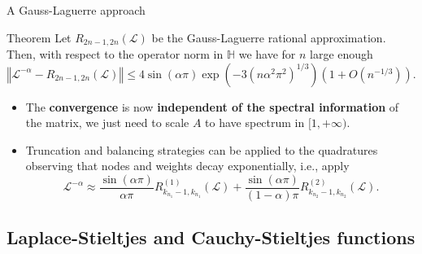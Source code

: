 \documentclass[aspectratio=169,xcolor=dvipsnames]{beamer}
\begin{document}
	\begin{frame}{A Gauss-Laguerre approach~\parencite{MR4410753}}	
	
	\begin{alertblock}{Theorem \parencite[Proposition 5.3]{MR4410753}}
	Let $R_{2n-1,2n}(\mathcal{L})$ be the Gauss-Laguerre rational approximation. Then, with respect to the operator norm in $\mathbb{H}$ we have for $n$ large enough 
	\begin{equation*}
		\left\Vert \mathcal{L}^{-\alpha }-R_{2n-1,2n}(\mathcal{L})\right\Vert  \leq 4\sin
		(\alpha \pi )\exp \left( -3\left( n\alpha ^{2}\pi ^{2}\right) ^{1/3}\right)
		\left( 1+O\left( n^{-1/3}\right) \right). 
	\end{equation*}
	\end{alertblock}

	\begin{itemize}
		\item[\textcolor{success}{\faSmile}]<2-> The \textbf{convergence} is now \textbf{independent of the spectral information} of the matrix, we just need to scale $A$ to have spectrum in $[1,+\infty)$.
		\item[\faHammer]<3-> Truncation and balancing strategies can be applied to the quadratures observing that nodes and weights decay exponentially, i.e., apply
		\begin{equation*}
			\mathcal{L}^{-\alpha }\approx \frac{\sin (\alpha \pi )}{\alpha \pi } 
			R_{k_{n_{1}}-1,k_{n_{1}}}^{(1)}(\mathcal{L})+  \frac{\sin (\alpha \pi )}{(1-\alpha) \pi }  R_{k_{n_{2}}-1,k_{n_{2}}}^{(2)}(%
			\mathcal{L}).
		\end{equation*}%
	\end{itemize}
	
	\end{frame}

	\subsection{Laplace-Stieltjes and  Cauchy-Stieltjes functions}
	
\end{document}
